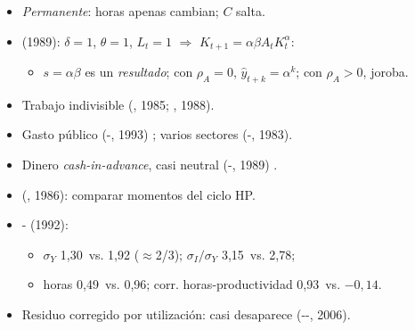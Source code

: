 \documentclass{article}
\begin{document}
\begin{columnas}
\begin{itemize}
\begin{itemize}
  \item $Y$↑; $w$ y $r$↑: \emph{sustitución intertemporal} (trabajar ahora);
  \item se ahorra la renta extra: $I$↑↑, $C$↑ poco;
  \item $I$ de hoy = $K$ de mañana (\emph{propagación}); la persistencia viene sobre todo de $\rho_A$.
  \end{itemize}
\item \emph{Permanente}: horas apenas cambian; $C$ salta.
\end{itemize}
\begin{itemize}
\item {} (1989): $\delta=1$, $\theta=1$, $L_t=1$ $\Rightarrow$ $K_{t+1}=\alpha\beta A_tK_t^{\alpha}$:
  \begin{itemize}
  \item $s=\alpha\beta$ es un \emph{resultado}; con $\rho_A=0$, $\hat y_{t+k}=\alpha^k$; con $\rho_A>0$, joroba.
  \end{itemize}
\end{itemize}
\begin{itemize}
\item Trabajo indivisible (, 1985; , 1988).
\item Gasto público (-, 1993) ; varios sectores (-, 1983).
\item Dinero \emph{cash-in-advance}, casi neutral (-, 1989) .
\end{itemize}
\begin{itemize}
\item {} (, 1986): comparar momentos del ciclo HP.
\item {}- (1992):
  \begin{itemize}
  \item $\sigma_Y$ 1,30~vs. 1,92 ($\approx$2/3); $\sigma_I/\sigma_Y$ 3,15~vs. 2,78;
  \item horas 0,49~vs. 0,96; corr. horas-productividad 0,93~vs. $-0{,}14$.
  \end{itemize}
\item Residuo corregido por utilización: casi desaparece (--, 2006).

\end{itemize}
\end{columnas}
\end{document}
